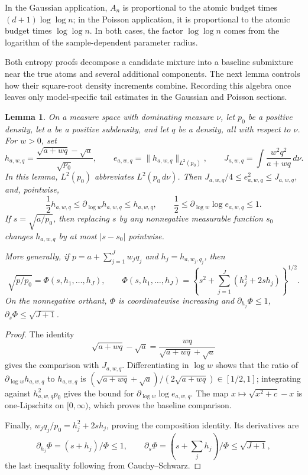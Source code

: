 \documentclass[11pt]{article}
\newtheorem{lemma}[theorem]{Lemma}
\theoremstyle{definition}
\numberwithin{equation}{section}
\begin{document}
In the Gaussian application, \(A_n\) is proportional to the atomic budget
times \((d+1)\log\log n\); in the Poisson application, it is proportional to
the atomic budget times \(\log\log n\). In both cases, the factor
\(\log\log n\) comes from the logarithm of the sample-dependent parameter
radius.

Both entropy proofs decompose a candidate mixture into a baseline submixture
near the true atoms and several additional components. The next lemma controls
how their square-root density increments combine. Recording this algebra once
leaves only model-specific tail estimates in the Gaussian and Poisson
sections.

\begin{lemma}
\label{lem:contaminant-calculus}
On a measure space with dominating measure \(\nu\), let \(p_0\) be a
positive density, let \(a\) be a positive subdensity, and let \(q\) be a
density, all with respect to \(\nu\). For \(w>0\), set
\[
 h_{a,w,q}=\frac{\sqrt{a+wq}-\sqrt a}{\sqrt{p_0}},
 \qquad e_{a,w,q}=\|h_{a,w,q}\|_{L^2(p_0)},
 \qquad J_{a,w,q}=\int\frac{w^2q^2}{a+wq}\,d\nu.
\]
In this lemma, \(L^2(p_0)\) abbreviates \(L^2(p_0\,d\nu)\).
Then \(J_{a,w,q}/4\le e_{a,w,q}^2\le J_{a,w,q}\), and, pointwise,
\[
 \frac12h_{a,w,q}
 \le\partial_{\log w}h_{a,w,q}\le h_{a,w,q},
 \qquad
 \frac12\le\partial_{\log w}\log e_{a,w,q}\le1.
\]
If \(s=\sqrt{a/p_0}\), then replacing \(s\) by any nonnegative measurable
function \(s_0\) changes
\(h_{a,w,q}\) by at most \(|s-s_0|\) pointwise.

More generally, if
\(p=a+\sum_{j=1}^Jw_jq_j\) and \(h_j=h_{a,w_j,q_j}\), then
\[
 \sqrt{p/p_0}=\Phi(s,h_1,\ldots,h_J),
 \qquad
 \Phi(s,h_1,\ldots,h_J)
 =\left\{s^2+\sum_{j=1}^J(h_j^2+2sh_j)\right\}^{1/2}.
\]
On the nonnegative orthant, \(\Phi\) is coordinatewise increasing and
\(\partial_{h_j}\Phi\le1\), \(\partial_s\Phi\le\sqrt{J+1}\).
\end{lemma}

\begin{proof}
The identity
\[
 \sqrt{a+wq}-\sqrt a
 =\frac{wq}{\sqrt{a+wq}+\sqrt a}
\]
gives the comparison with \(J_{a,w,q}\). Differentiating in \(\log w\)
shows that the ratio of \(\partial_{\log w}h_{a,w,q}\) to
\(h_{a,w,q}\) is
\((\sqrt{a+wq}+\sqrt a)/(2\sqrt{a+wq})\in[1/2,1]\); integrating against
\(h_{a,w,q}^2p_0\) gives the bound for \(\partial_{\log w}\log e_{a,w,q}\).
The map \(x\mapsto\sqrt{x^2+c}-x\) is one-Lipschitz on
\([0,\infty)\), which proves the baseline comparison.

Finally, \(w_jq_j/p_0=h_j^2+2sh_j\), proving the composition identity.
Its derivatives are
\[
 \partial_{h_j}\Phi=(s+h_j)/\Phi\le1,
 \qquad
 \partial_s\Phi=(s+\sum_jh_j)/\Phi\le\sqrt{J+1},
\]
the last inequality following from Cauchy--Schwarz.
\end{proof}
\end{document}
